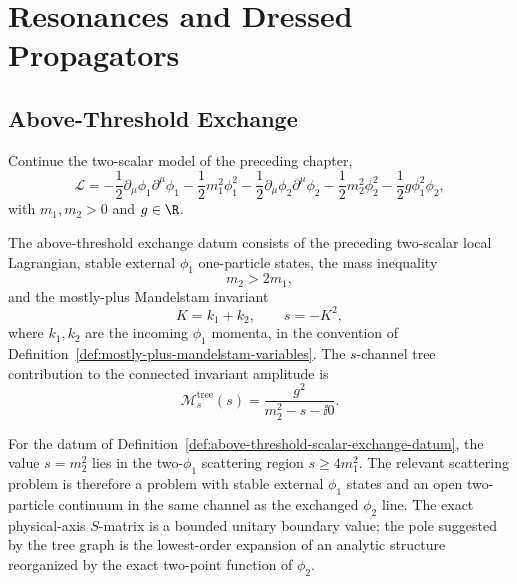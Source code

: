 \chapter{Resonances and Dressed Propagators}
\label{ch:volume-ii-resonances-dressed-propagators}
\ConventionsLorentzian


\section{Above-Threshold Exchange}

Continue the two-scalar model of the preceding chapter,
\[
  \mathcal L
  =
  -\frac12\partial_\mu\phi_1\partial^\mu\phi_1
  -\frac12m_1^2\phi_1^2
  -\frac12\partial_\mu\phi_2\partial^\mu\phi_2
  -\frac12m_2^2\phi_2^2
  -\frac12g\phi_1^2\phi_2 ,
\]
with \(m_1,m_2>0\) and \(g\in\R\).

\begin{definition}
\label{def:above-threshold-scalar-exchange-datum}
The above-threshold exchange datum consists of the preceding two-scalar local
Lagrangian, stable external \(\phi_1\) one-particle states, the mass
inequality
\[
  m_2>2m_1 ,
\]
and the mostly-plus Mandelstam invariant
\[
  K=k_1+k_2,\qquad s=-K^2,
\]
where \(k_1,k_2\) are the incoming \(\phi_1\) momenta, in the convention of
Definition~\ref{def:mostly-plus-mandelstam-variables}.  The \(s\)-channel tree
contribution to the connected invariant amplitude is
\[
  \mathcal M_s^{\mathrm{tree}}(s)
  =
  \frac{g^2}{m_2^2-s-\ii0}.
\]
\end{definition}

For the datum of
Definition~\ref{def:above-threshold-scalar-exchange-datum},
the value \(s=m_2^2\) lies in the two-\(\phi_1\) scattering region
\(s\ge4m_1^2\). The relevant scattering problem is therefore a problem with
stable external \(\phi_1\) states and an open two-particle continuum in the
same channel as the exchanged \(\phi_2\) line. The exact physical-axis
\(S\)-matrix is a bounded unitary boundary value; the pole suggested by the
tree graph is the lowest-order expansion of an analytic structure reorganized
by the exact two-point function of \(\phi_2\).


